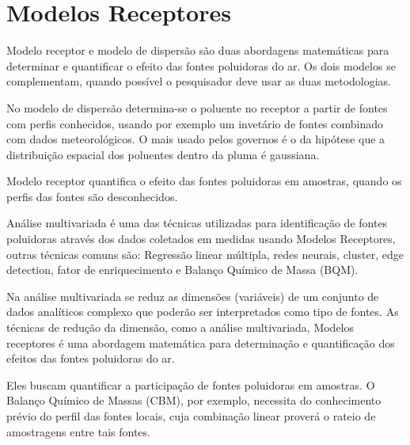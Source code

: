 \section{Modelos Receptores}

Modelo receptor e modelo de dispersão são duas abordagens matemáticas 
para determinar e quantificar o efeito das fontes poluidoras do ar. 
Os dois modelos se complementam, quando possível o pesquisador deve
usar as duas metodologias. 

No modelo de dispersão determina-se o poluente no receptor a 
partir de fontes com perfis conhecidos, usando por exemplo um invetário de 
fontes combinado com dados meteorológicos. O mais usado pelos governos é o da 
hipótese que a distribuição espacial dos poluentes dentro da pluma é gaussiana. 

Modelo receptor quantifica o efeito das fontes poluidoras em amostras, 
quando os perfis das fontes são desconhecidos.

Análise multivariada é uma das técnicas utilizadas para identificação
de fontes poluidoras através dos dados coletados em medidas usando
Modelos Receptores, outras técnicas comuns são: Regressão linear múltipla,
redes neurais, cluster, edge detection, fator de enriquecimento e 
Balanço Químico de Massa (BQM).  

Na análise multivariada se reduz as dimensões (variáveis) de um 
conjunto de dados analíticos complexo que poderão ser interpretados 
como tipo de fontes.
As técnicas de redução da dimensão, como a análise multivariada, 
Modelos receptores é uma abordagem matemática para determinação e 
quantificação dos efeitos das fontes poluidoras do ar. 


Eles buscam quantificar a participação de fontes poluidoras em amostras. 
O Balanço Químico de Massas (CBM), por exemplo, necessita do conhecimento prévio do perfil 
das fontes locais, cuja combinação linear proverá o rateio de amostragens entre tais fontes. 


